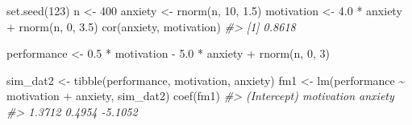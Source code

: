 \documentclass[
  11pt,
]{krantz}
\makeatletter
\newenvironment{Shaded}{\begin{snugshade}}{\end{snugshade}}
\newcommand{\CommentTok}[1]{\textcolor[rgb]{0.37,0.37,0.37}{\textit{#1}}}
\newcommand{\DecValTok}[1]{\textcolor[rgb]{0.06,0.06,0.06}{#1}}
\newcommand{\FloatTok}[1]{\textcolor[rgb]{0.06,0.06,0.06}{#1}}
\newcommand{\FunctionTok}[1]{\textcolor[rgb]{0,0,0}{#1}}
\newcommand{\NormalTok}[1]{#1}
\newcommand{\OtherTok}[1]{\textcolor[rgb]{0.37,0.37,0.37}{#1}}
\newcommand{\SpecialCharTok}[1]{\textcolor[rgb]{0,0,0}{#1}}
\newenvironment{kframe}{%
\medskip{}
\setlength{\fboxsep}{.8em}
 \def\at@end@of@kframe{}%
 \ifinner\ifhmode%
  \def\at@end@of@kframe{\end{minipage}}%
  \begin{minipage}{\columnwidth}%
 \fi\fi%
 \def\FrameCommand##1{\hskip\@totalleftmargin \hskip-\fboxsep
 \colorbox{shadecolor}{##1}\hskip-\fboxsep
     \hskip-\linewidth \hskip-\@totalleftmargin \hskip\columnwidth}%
 \MakeFramed {\advance\hsize-\width
   \@totalleftmargin\z@ \linewidth\hsize
   \@setminipage}}%
 {\par\unskip\endMakeFramed%
 \at@end@of@kframe}
\renewenvironment{Shaded}{\begin{kframe}}{\end{kframe}}
\theoremstyle{definition}
\theoremstyle{definition}
\theoremstyle{definition}
\theoremstyle{definition}
\theoremstyle{remark}
\makeatother
\begin{document}
\begin{Shaded}
\begin{Highlighting}[]
\FunctionTok{set.seed}\NormalTok{(}\DecValTok{123}\NormalTok{)}
\NormalTok{n }\OtherTok{\textless{}{-}} \DecValTok{400}
\NormalTok{anxiety }\OtherTok{\textless{}{-}} \FunctionTok{rnorm}\NormalTok{(n, }\DecValTok{10}\NormalTok{, }\FloatTok{1.5}\NormalTok{)}
\NormalTok{motivation }\OtherTok{\textless{}{-}} \FloatTok{4.0} \SpecialCharTok{*}\NormalTok{ anxiety }\SpecialCharTok{+} \FunctionTok{rnorm}\NormalTok{(n, }\DecValTok{0}\NormalTok{, }\FloatTok{3.5}\NormalTok{)}
\FunctionTok{cor}\NormalTok{(anxiety, motivation)}
\CommentTok{\#\textgreater{} [1] 0.8618}
\end{Highlighting}
\end{Shaded}

\begin{Shaded}
\begin{Highlighting}[]
\NormalTok{performance }\OtherTok{\textless{}{-}} \FloatTok{0.5} \SpecialCharTok{*}\NormalTok{ motivation }\SpecialCharTok{{-}} \FloatTok{5.0} \SpecialCharTok{*}\NormalTok{ anxiety }\SpecialCharTok{+} \FunctionTok{rnorm}\NormalTok{(n, }\DecValTok{0}\NormalTok{, }\DecValTok{3}\NormalTok{)}
\end{Highlighting}
\end{Shaded}

\begin{Shaded}
\begin{Highlighting}[]
\NormalTok{sim\_dat2 }\OtherTok{\textless{}{-}} \FunctionTok{tibble}\NormalTok{(performance, motivation, anxiety)}
\NormalTok{fm1 }\OtherTok{\textless{}{-}} \FunctionTok{lm}\NormalTok{(performance }\SpecialCharTok{\textasciitilde{}}\NormalTok{ motivation }\SpecialCharTok{+}\NormalTok{ anxiety, sim\_dat2)}
\FunctionTok{coef}\NormalTok{(fm1)}
\CommentTok{\#\textgreater{} (Intercept)  motivation     anxiety }
\CommentTok{\#\textgreater{}      1.3712      0.4954     {-}5.1052}
\end{Highlighting}
\end{Shaded}
\end{document}
